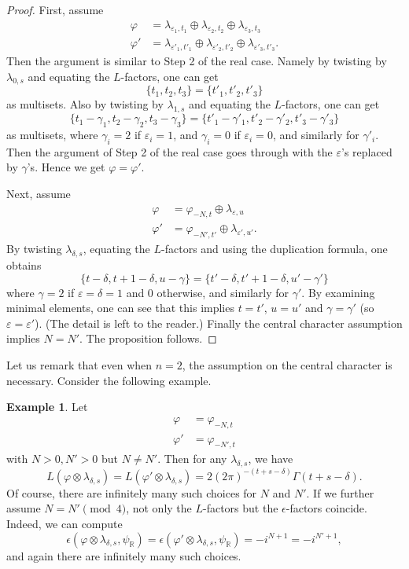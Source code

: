 \documentclass[11pt]{amsart}
\theoremstyle{plain}
\theoremstyle{definition}
\newtheorem{Ex}{Example}
\numberwithin{equation}{section}
\newcommand{\R}{\mathbb{R}}
\newcommand{\la}{\lambda}
\newcommand{\ep}{\varepsilon}
\begin{document}
\begin{proof}
First, assume
\begin{align*}
\varphi&=\la_{\ep_1, t_1}\oplus\la_{\ep_2, t_2}\oplus\la_{\ep_3, t_3}\\
\varphi'&=\la_{\ep'_1, t'_1}\oplus\la_{\ep'_2, t'_2}\oplus\la_{\ep'_3, t'_3}.
\end{align*}
Then the argument is similar to Step 2 of the real case. Namely by
twisting by $\la_{0, s}$ and equating the $L$-factors, one can get
\[
\{t_1,t_2,t_3\}=\{t'_1,t'_2,t'_3\}
\]
as multisets. Also by twisting by $\la_{1,s}$ and equating the $L$-factors, one can get
\[
\{t_1-\gamma_1,t_2-\gamma_2,t_3-\gamma_3\}=
\{t'_1-\gamma'_1,t'_2-\gamma'_2,t'_3-\gamma'_3\}
\]
as multisets, where $\gamma_i=2$ if $\ep_i=1$, and $\gamma_i=0$ if
$\ep_i=0$, and similarly for $\gamma'_i$. Then the argument of Step 2 of the real case goes
through with the $\ep$'s replaced by $\gamma$'s. Hence we get $\varphi=\varphi'$.

Next, assume
\begin{align*}
\varphi&=\varphi_{-N, t}\oplus\la_{\ep, u}\\
\varphi'&=\varphi_{-N', t'}\oplus\la_{\ep', u'}.
\end{align*}
By twisting $\la_{\delta, s}$, equating the $L$-factors and using the
duplication formula, one obtains
\[
\{t-\delta, t+1-\delta, u-\gamma\}=
\{t'-\delta, t'+1-\delta, u'-\gamma'\}
\]
where $\gamma=2$ if $\ep=\delta=1$ and 0 otherwise, and similarly for
$\gamma'$. By examining minimal elements, one can see that this implies
$t=t'$, $u=u'$ and $\gamma=\gamma'$ (so $\ep=\ep'$). (The detail is left to the reader.) Finally the
central character assumption implies $N=N'$. The proposition follows.
\end{proof}

Let us remark that even when $n=2$, the assumption on the central
character is necessary. Consider the following example.
\begin{Ex}
Let 
\begin{align*}
\varphi&=\varphi_{-N, t}\\
\varphi'&=\varphi_{-N', t}
\end{align*}
with $N>0, N'>0$ but $N\neq N'$. Then for any
$\la_{\delta, s}$, we have
\[
L(\varphi\otimes\la_{\delta, s})=L(\varphi'\otimes\la_{\delta,s})
=2(2\pi)^{-(t+s-\delta)}\Gamma(t+s-\delta).
\]
Of course, there are infinitely many such choices for $N$ and
$N'$. If we further assume $N=N'\pmod{4}$, not only the $L$-factors
but the $\epsilon$-factors coincide. Indeed, we can compute
\[
\epsilon(\varphi\otimes\la_{\delta, s},
  \psi_\R)=\epsilon(\varphi'\otimes\la_{\delta, s}, \psi_\R)
=-i^{N+1}=-i^{N'+1},
\]
and again there are infinitely many such choices.
\end{Ex}
\end{document}
